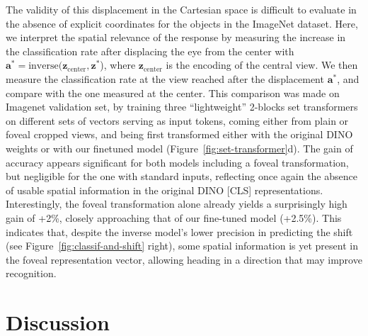 \documentclass{article}
\begin{document}
The validity of this displacement in the Cartesian space is difficult to evaluate in the absence of explicit coordinates
for the objects in the ImageNet dataset. Here, we interpret the spatial relevance of the response by
measuring the increase in the classification rate after displacing the eye from the center
with $\boldsymbol{a}^* = \text{inverse}(\boldsymbol{z}_\text{center}, \boldsymbol{z}^*$), where $\boldsymbol{z}_\text{center}$ is the encoding of the central view. We then measure the classification rate at the view reached after the displacement $\boldsymbol{a}^*$, and compare with the one measured at the center. This comparison was made on Imagenet validation set, by training three ``lightweight'' 2-blocks set transformers on different sets of vectors serving as input tokens, coming either from plain or foveal cropped views, and being first transformed either with the original DINO weights or with our finetuned model (Figure~\ref{fig:set-transformer}d). The gain of accuracy appears significant for both models including a foveal transformation, but negligible for the one with standard inputs, reflecting once again the absence of usable spatial information in the original DINO [CLS] representations. Interestingly, the foveal transformation alone already yields a surprisingly high gain of +2\%, closely approaching that of our fine-tuned model (+2.5\%). This indicates that, despite the inverse model's lower precision in predicting the shift (see Figure~\ref{fig:classif-and-shift} right), some spatial information is yet present in the foveal representation vector, allowing heading in a direction that may improve recognition.

\section{Discussion}

\end{document}
